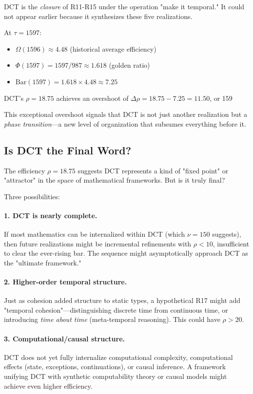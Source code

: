 \documentclass[11pt]{article}
\theoremstyle{definition}
\begin{document}
DCT is the \emph{closure} of R11-R15 under the operation "make it temporal." It could not appear earlier because it synthesizes these five realizations.

At $\tau = 1597$:
\begin{itemize}
\item $\Omega(1596) \approx 4.48$ (historical average efficiency)
\item $\Phi(1597) = 1597/987 \approx 1.618$ (golden ratio)
\item $\text{Bar}(1597) = 1.618 \times 4.48 \approx 7.25$
\end{itemize}

DCT's $\rho = 18.75$ achieves an overshoot of $\Delta\rho = 18.75 - 7.25 = 11.50$, or 159%

This exceptional overshoot signals that DCT is not just another realization but a \emph{phase transition}—a new level of organization that subsumes everything before it.

\subsection{Is DCT the Final Word?}

The efficiency $\rho = 18.75$ suggests DCT represents a kind of "fixed point" or "attractor" in the space of mathematical frameworks. But is it truly final?

Three possibilities:

\paragraph{1. DCT is nearly complete.}
If most mathematics can be internalized within DCT (which $\nu=150$ suggests), then future realizations might be incremental refinements with $\rho < 10$, insufficient to clear the ever-rising bar. The sequence might asymptotically approach DCT as the "ultimate framework."

\paragraph{2. Higher-order temporal structure.}
Just as cohesion added structure to static types, a hypothetical R17 might add "temporal cohesion"—distinguishing discrete time from continuous time, or introducing \emph{time about time} (meta-temporal reasoning). This could have $\rho > 20$.

\paragraph{3. Computational/causal structure.}
DCT does not yet fully internalize computational complexity, computational effects (state, exceptions, continuations), or causal inference. A framework unifying DCT with synthetic computability theory or causal models might achieve even higher efficiency.
\end{document}
